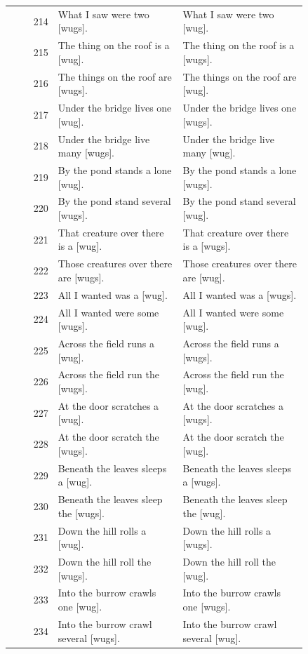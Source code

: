 \begin{longtable}{@{}rp{0.42\linewidth}p{0.42\linewidth}@{}}
214 & What I saw were two {[}wugs{]}. & What I saw were two {[}wug{]}. \\
215 & The thing on the roof is a {[}wug{]}. & The thing on the roof is a {[}wugs{]}. \\
216 & The things on the roof are {[}wugs{]}. & The things on the roof are {[}wug{]}. \\
217 & Under the bridge lives one {[}wug{]}. & Under the bridge lives one {[}wugs{]}. \\
218 & Under the bridge live many {[}wugs{]}. & Under the bridge live many {[}wug{]}. \\
219 & By the pond stands a lone {[}wug{]}. & By the pond stands a lone {[}wugs{]}. \\
220 & By the pond stand several {[}wugs{]}. & By the pond stand several {[}wug{]}. \\
221 & That creature over there is a {[}wug{]}. & That creature over there is a {[}wugs{]}. \\
222 & Those creatures over there are {[}wugs{]}. & Those creatures over there are {[}wug{]}. \\
223 & All I wanted was a {[}wug{]}. & All I wanted was a {[}wugs{]}. \\
224 & All I wanted were some {[}wugs{]}. & All I wanted were some {[}wug{]}. \\
225 & Across the field runs a {[}wug{]}. & Across the field runs a {[}wugs{]}. \\
226 & Across the field run the {[}wugs{]}. & Across the field run the {[}wug{]}. \\
227 & At the door scratches a {[}wug{]}. & At the door scratches a {[}wugs{]}. \\
228 & At the door scratch the {[}wugs{]}. & At the door scratch the {[}wug{]}. \\
229 & Beneath the leaves sleeps a {[}wug{]}. & Beneath the leaves sleeps a {[}wugs{]}. \\
230 & Beneath the leaves sleep the {[}wugs{]}. & Beneath the leaves sleep the {[}wug{]}. \\
231 & Down the hill rolls a {[}wug{]}. & Down the hill rolls a {[}wugs{]}. \\
232 & Down the hill roll the {[}wugs{]}. & Down the hill roll the {[}wug{]}. \\
233 & Into the burrow crawls one {[}wug{]}. & Into the burrow crawls one {[}wugs{]}. \\
234 & Into the burrow crawl several {[}wugs{]}. & Into the burrow crawl several {[}wug{]}. \\

\end{longtable}

